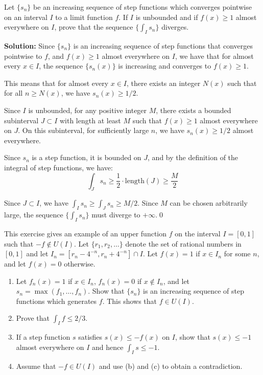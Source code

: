\begin{problembox}
Let $\{s_n\}$ be an increasing sequence of step functions which converges pointwise on an interval $I$ to a limit function $f$. If $I$ is unbounded and if $f(x) \geq 1$ almost everywhere on $I$, prove that the sequence $\{\int_I s_n\}$ diverges.
\end{problembox}

\noindent\textbf{Solution:}
Since $\{s_n\}$ is an increasing sequence of step functions that converges pointwise to $f$, and $f(x) \geq 1$ almost everywhere on $I$, we have that for almost every $x \in I$, the sequence $\{s_n(x)\}$ is increasing and converges to $f(x) \geq 1$.

This means that for almost every $x \in I$, there exists an integer $N(x)$ such that for all $n \geq N(x)$, we have $s_n(x) \geq 1/2$.

Since $I$ is unbounded, for any positive integer $M$, there exists a bounded subinterval $J \subset I$ with length at least $M$ such that $f(x) \geq 1$ almost everywhere on $J$. On this subinterval, for sufficiently large $n$, we have $s_n(x) \geq 1/2$ almost everywhere.

Since $s_n$ is a step function, it is bounded on $J$, and by the definition of the integral of step functions, we have:
\[\int_J s_n \geq \frac{1}{2} \cdot \text{length}(J) \geq \frac{M}{2}\]

Since $J \subset I$, we have $\int_I s_n \geq \int_J s_n \geq M/2$. Since $M$ can be chosen arbitrarily large, the sequence $\{\int_I s_n\}$ must diverge to $+\infty$.\qed


\begin{problembox}
This exercise gives an example of an upper function $f$ on the interval $I = [0, 1]$ such that $-f \notin U(I)$. Let $\{r_1, r_2, \ldots\}$ denote the set of rational numbers in $[0, 1]$ and let $I_n = [r_n - 4^{-n}, r_n + 4^{-n}] \cap I$. Let $f(x) = 1$ if $x \in I_n$ for some $n$, and let $f(x) = 0$ otherwise.
\begin{enumerate}[label=(\alph*)]
    \item Let $f_n(x) = 1$ if $x \in I_n$, $f_n(x) = 0$ if $x \notin I_n$, and let $s_n = \max(f_1, \ldots, f_n)$. Show that $\{s_n\}$ is an increasing sequence of step functions which generates $f$. This shows that $f \in U(I)$.
    \item Prove that $\int_I f \leq 2/3$.
    \item If a step function $s$ satisfies $s(x) \leq -f(x)$ on $I$, show that $s(x) \leq -1$ almost everywhere on $I$ and hence $\int_I s \leq -1$.
    \item Assume that $-f \in U(I)$ and use (b) and (c) to obtain a contradiction.
\end{enumerate}
\end{problembox}

